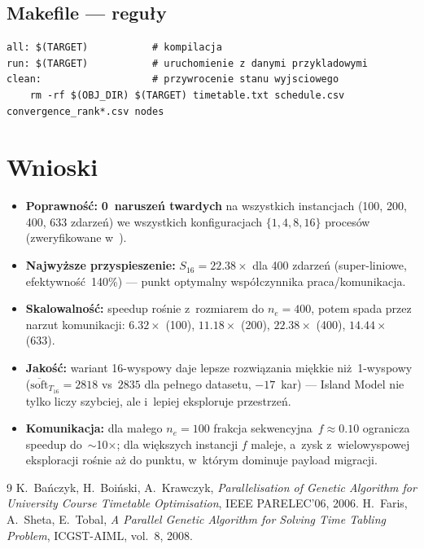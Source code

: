 \documentclass{common/sprawozdanie-agh}
\begin{document}
\subsection{Makefile --- reguły}

\begin{lstlisting}[style=makefilestyle, caption={Kluczowe reguły Makefile}]
all: $(TARGET)           # kompilacja
run: $(TARGET)           # uruchomienie z danymi przykladowymi
clean:                   # przywrocenie stanu wyjsciowego
    rm -rf $(OBJ_DIR) $(TARGET) timetable.txt schedule.csv convergence_rank*.csv nodes
\end{lstlisting}

\section{Wnioski}

\begin{itemize}
    \item \textbf{Poprawność:} \textbf{0~naruszeń twardych} na wszystkich instancjach (100, 200, 400, 633 zdarzeń) we wszystkich konfiguracjach $\{1, 4, 8, 16\}$ procesów (zweryfikowane w~).
    \item \textbf{Najwyższe przyspieszenie:} $S_{16}=22.38\times$ dla 400 zdarzeń (super-liniowe, efektywność~140\%) --- punkt optymalny współczynnika praca/komunikacja.
    \item \textbf{Skalowalność:} speedup rośnie z~rozmiarem do $n_e=400$, potem spada przez narzut komunikacji: $6.32\times$ (100), $11.18\times$ (200), $\mathbf{22.38\times}$ (400), $14.44\times$ (633).
    \item \textbf{Jakość:} wariant 16-wyspowy daje lepsze rozwiązania miękkie niż~1-wyspowy ($\overline{\text{soft}}_{T_{16}}=2818$ vs~$2835$ dla pełnego datasetu, $-17$~kar) --- Island Model nie tylko liczy szybciej, ale i~lepiej eksploruje przestrzeń.
    \item \textbf{Komunikacja:} dla małego $n_e=100$ frakcja sekwencyjna~$f \approx 0.10$ ogranicza speedup do~$\sim$10$\times$; dla większych instancji $f$ maleje, a~zysk z~wielowyspowej eksploracji rośnie aż do punktu, w~którym dominuje payload migracji.
\end{itemize}

\begin{thebibliography}{9}
 K.~Bańczyk, H.~Boiński, A.~Krawczyk, \textit{Parallelisation of Genetic Algorithm for University Course Timetable Optimisation}, IEEE PARELEC'06, 2006.
 H.~Faris, A.~Sheta, E.~Tobal, \textit{A Parallel Genetic Algorithm for Solving Time Tabling Problem}, ICGST-AIML, vol.~8, 2008.
\end{thebibliography}
\end{document}
